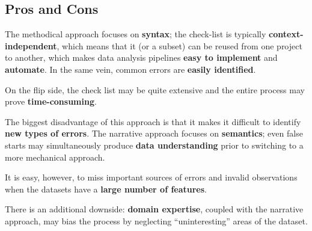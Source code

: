 \subsection{Pros and Cons}
The methodical approach focuses on  \textbf{syntax}; the check-list is typically \textbf{context-independent}, which means that it (or a subset) can be reused from one project to another, which makes data analysis pipelines \textbf{easy to implement} and \textbf{automate}. In the same vein, common errors are \textbf{easily identified}.\par  On the flip side, the check list may be quite extensive and the entire process may prove \textbf{time-consuming}.\par The biggest disadvantage of this approach is that it makes it difficult to identify \textbf{new types of errors}.\newl
The narrative approach focuses on \textbf{semantics}; even false starts may simultaneously produce \textbf{data understanding} prior to switching to a more mechanical approach.\par It is easy, however, to miss important sources of errors and invalid observations when the datasets have a \textbf{large number of features}. \par There is an additional downside: \textbf{domain expertise}, coupled with the narrative approach,  may bias the process by neglecting ``uninteresting'' areas of the dataset.
